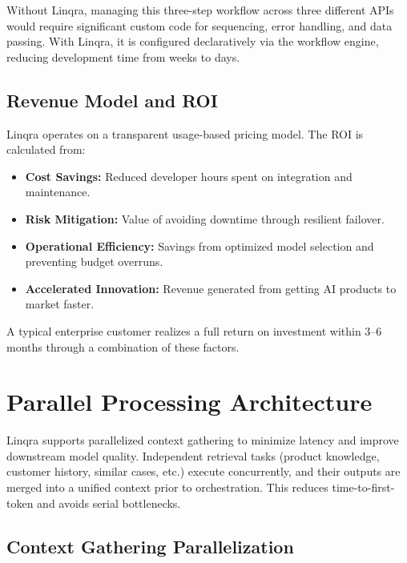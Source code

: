 \documentclass[11pt,a4paper]{article}
\begin{document}
Without Linqra, managing this three-step workflow across three different APIs would require significant custom code for sequencing, error handling, and data passing. With Linqra, it is configured declaratively via the workflow engine, reducing development time from weeks to days.

\subsection{Revenue Model and ROI}
Linqra operates on a transparent usage-based pricing model. The ROI is calculated from:

\begin{itemize}[leftmargin=1.8em]
  \item[\textcolor{linqraprimary}{\faCoins}] \textbf{Cost Savings:} Reduced developer hours spent on integration and maintenance.
  \item[\textcolor{linqraprimary}{\faIcon{shield-alt}}] \textbf{Risk Mitigation:} Value of avoiding downtime through resilient failover.
  \item[\textcolor{linqraprimary}{\faCogs}] \textbf{Operational Efficiency:} Savings from optimized model selection and preventing budget overruns.
  \item[\textcolor{linqraprimary}{\faRocket}] \textbf{Accelerated Innovation:} Revenue generated from getting AI products to market faster.
\end{itemize}

A typical enterprise customer realizes a full return on investment within 3--6 months through a combination of these factors.

\newpage

\section{Parallel Processing Architecture}

Linqra supports parallelized context gathering to minimize latency and improve downstream model quality. Independent retrieval tasks (product knowledge, customer history, similar cases, etc.) execute concurrently, and their outputs are merged into a unified context prior to orchestration. This reduces time-to-first-token and avoids serial bottlenecks.

\subsection{Context Gathering Parallelization}
\end{document}
